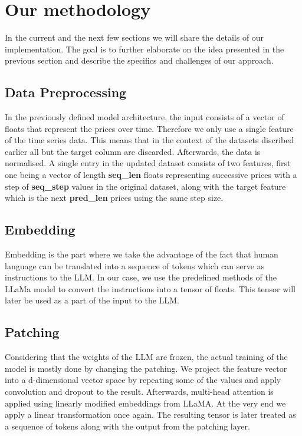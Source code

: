 \section{Our methodology}
In the current and the next few sections we will share the details of our implementation. The goal is to further elaborate on the idea presented in the previous section and describe the specifics and challenges of our approach. \\

\subsection{Data Preprocessing}
In the previously defined model architecture, the input consists of a vector of floats that represent the prices over time. Therefore we only use a single feature of the time series data. This means that in the context of the datasets discribed earlier all but the target column are discarded. Afterwards, the data is normalised. A single entry in the updated dataset consists of two features, first one being a vector of length \textbf{seq\_len} floats representing successive prices with a step of \textbf{seq\_step} values in the original dataset, along with the target feature which is the next \textbf{pred\_len} prices using the same step size. \\
\subsection{Embedding}
Embedding is the part where we take the advantage of the fact that human language can be translated into a sequence of tokens which can serve as instructions to the LLM. In our case, we use the predefined methods of the LLaMa model to convert the instructions into a tensor of floats. This tensor will later be used as a part of the input to the LLM. \\

\subsection{Patching}

Considering that the weights of the LLM are frozen, the actual training of the model is mostly done by changing the patching. We project the feature vector into a d-dimensional vector space by repeating some of the values and apply convolution and dropout to the result. Afterwards, multi-head attention is applied using linearly modified embeddings from LLaMA. At the very end we apply a linear transformation once again. The resulting tensor is later treated as a sequence of tokens along with the output from the patching layer. \\

